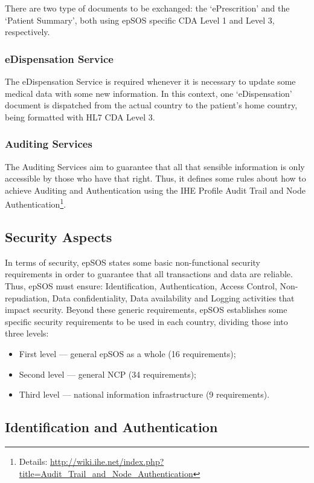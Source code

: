 There are two type of documents to be exchanged: the `ePrescrition' and the `Patient Summary', both using epSOS specific CDA Level 1 and Level 3, respectively.

\subsubsection{eDispensation Service}

The eDispensation Service is required whenever it is necessary to update some medical data with some new information. In this context, one `eDispensation' document is dispatched from the actual country to the patient's home country, being formatted with HL7 CDA Level 3.

\subsubsection{Auditing Services}

The Auditing Services aim to guarantee that all that sensible information is only accessible by those who have that right. Thus, it defines some rules about how to achieve Auditing and Authentication using the IHE Profile Audit Trail and Node Authentication\footnote{Details: \url{http://wiki.ihe.net/index.php?title=Audit_Trail_and_Node_Authentication}}. 

\subsection{Security Aspects}
In terms of security, epSOS states some basic non-functional security requirements in order to guarantee that all transactions and data are reliable. Thus, epSOS must ensure: Identification, Authentication, Access Control, Non-repudiation, Data confidentiality, Data availability and Logging activities that impact security. Beyond these generic requirements, epSOS establishes some specific security requirements to be used in each country, dividing those into three levels:
\begin{itemize}
\item First level --- general epSOS as a whole (16 requirements);
\item Second level --- general NCP (34 requirements);
\item Third level --- national information infrastructure (9 requirements).
\end{itemize}

\subsection{Identification and Authentication}
